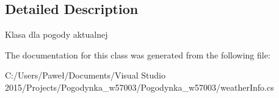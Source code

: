 \subsection{Detailed Description}
Klasa dla pogody aktualnej 



The documentation for this class was generated from the following file\+:\begin{DoxyCompactItemize}
\item 
C\+:/\+Users/\+Paweł/\+Documents/\+Visual Studio 2015/\+Projects/\+Pogodynka\+\_\+w57003/\+Pogodynka\+\_\+w57003/weather\+Info.\+cs\end{DoxyCompactItemize}
